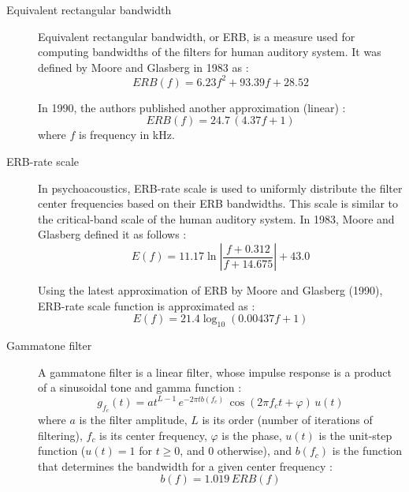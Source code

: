\begin{description}
	\item[Equivalent rectangular bandwidth] Equivalent rectangular bandwidth, or ERB, is a measure used for computing bandwidths of the filters for human auditory system. It was defined by Moore and Glasberg in 1983 as \cite{Moore1983}\cite{Holdsworth1988}:
	\begin{equation}
		ERB(f) = 6.23f^2 + 93.39f + 28.52
	\end{equation} 
	
	In 1990, the authors published another approximation (linear) \cite{Moore1990}\cite{Wang2006}:
	\begin{equation}
		ERB(f) = 24.7\,(4.37f + 1)
		\label{equation:ERB_1990}
	\end{equation}
	where $f$ is frequency in kHz.
	
	\item[ERB-rate scale] In psychoacoustics, ERB-rate scale is used to uniformly distribute the filter center frequencies based on their ERB bandwidths. This scale is similar to the critical-band scale of the human auditory system. In 1983, Moore and Glasberg defined it as follows \cite{Moore1983}:
	\begin{equation}
		E(f) = 11.17\ln\left|\frac{f + 0.312}{f + 14.675}\right| + 43.0
	\end{equation}
	
	Using the latest approximation of ERB by Moore and Glasberg (1990), ERB-rate scale function is approximated as \cite{Moore1990}\cite{Wang2006}:
	\begin{equation}
		E(f) = 21.4\log_{10}\left(0.00437f + 1\right)
	\end{equation}
	
	\item[Gammatone filter] A gammatone filter is a linear filter, whose impulse response is a product of a sinusoidal tone and gamma function \cite{Wang2006}:
	\begin{equation}
		g_{f_c}(t) = at^{L-1}\,e^{-2\pi{}tb(f_c)}\,\cos(2\pi{}f_c{}t + \varphi)\,u(t)
		\label{equation:gammatone_impulse_response}
	\end{equation}
	where $a$ is the filter amplitude, $L$ is its order (number of iterations of filtering), $f_c$ is its center frequency, $\varphi$ is the phase, $u(t)$ is the unit-step function ($u(t) = 1$ for $t \ge 0$, and $0$ otherwise), and $b(f_c)$ is the function that determines the bandwidth for a given center frequency \cite{Wang2006}:
	\begin{equation}
		b(f) = 1.019\,ERB(f)
	\end{equation}
	

\end{description}
